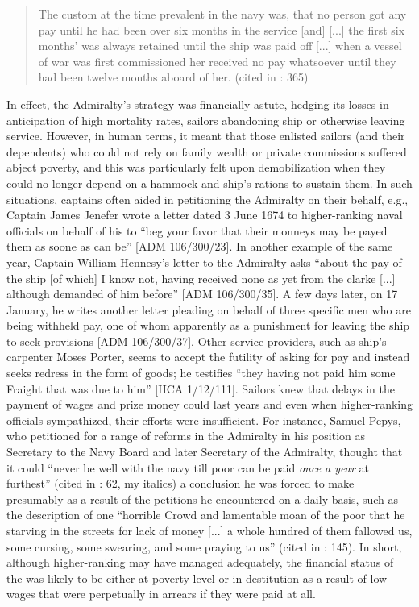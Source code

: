 \begin{quotation}
The custom at the time prevalent in the navy was, that no person got any pay until he had been over six months in the service [and] [...] the first six months’ was always retained until the ship was paid off [...] when a vessel of war was first commissioned her  received no pay whatsoever until they had been twelve months aboard of her. (cited in \citealt{AdkinsAdkins2008}: 365) \end{quotation}

In effect, the Admiralty’s strategy was financially astute, hedging its losses in anticipation of high mortality rates, sailors abandoning ship or otherwise leaving service. However, in human terms, it meant that those enlisted sailors (and their dependents) who could not rely on family wealth or private commissions suffered abject poverty, and this was particularly felt upon demobilization when they could no longer depend on a hammock and ship’s rations to sustain them. In such situations, captains often aided in petitioning the Admiralty on their behalf, e.g., Captain James Jenefer wrote a letter dated 3 June {1674} to higher-ranking naval officials on behalf of his  to “beg your favor that their monneys may be payed them as soone as can be” [ADM 106/300/23]. In another example of the same year, Captain William Hennesy’s letter to the Admiralty asks “about the pay of the ship [of which] I know not, having received none as yet from the clarke [...] although demanded of him before” [ADM 106/300/35]. A few days later, on 17 January, he writes another letter pleading on behalf of three specific men who are being withheld pay, one of whom apparently as a punishment for leaving the ship to seek provisions [ADM 106/300/37]. Other service-providers, such as ship’s carpenter Moses Porter, seems to accept the futility of asking for pay and instead seeks redress in the form of goods; he testifies “they having not paid him some Fraight that was due to him” [HCA 1/12/111]. Sailors knew that delays in the payment of wages and prize money could last years and even when higher-ranking officials sympathized, their efforts were insufficient. For instance, Samuel Pepys, who petitioned for a range of reforms in the Admiralty in his position as Secretary to the Navy Board and later Secretary of the Admiralty, thought that it could  “never be well with the navy till poor  can be paid \textit{once a year} at furthest” (cited in \citealt{Palmer1986}: 62, my italics) a conclusion he was forced to make presumably as a result of the petitions he encountered on a daily basis, such as the description of one “horrible Crowd and lamentable moan of the poor  that he starving in the streets for lack of money [...] a whole hundred of them fallowed us, some cursing, some swearing, and some praying to us” (cited in \citealt{Lincoln2015}: 145). In short, although higher-ranking  may have managed adequately, the financial status of the  was likely to be either at poverty level or in destitution as a result of low wages that were perpetually in arrears if they were paid at all.  

